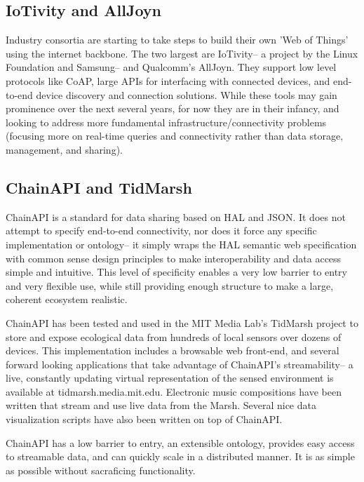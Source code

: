 \subsection{IoTivity and AllJoyn}

Industry consortia are starting to take steps to build their own 'Web of Things' using the internet backbone.  The two largest are IoTivity-- a project by the Linux Foundation and Samsung-- and Qualcomm's AllJoyn.  They support low level protocols like CoAP, large APIs for interfacing with connected devices, and end-to-end device discovery and connection solutions.  While these tools may gain prominence over the next several years, for now they are in their infancy, and looking to address more fundamental infrastructure/connectivity problems (focusing more on real-time queries and connectivity rather than data storage, management, and sharing).
		
\subsection{ChainAPI and TidMarsh}

ChainAPI is a standard for data sharing based on HAL and JSON.  It does not attempt to specify end-to-end connectivity, nor does it force any specific implementation or ontology-- it simply wraps the HAL semantic web specification with common sense design principles to make interoperability and data access simple and intuitive.  This level of specificity enables a very low barrier to entry and very flexible use, while still providing enough structure to make a large, coherent ecosystem realistic.

ChainAPI has been tested and used in the MIT Media Lab's TidMarsh project to store and expose ecological data from hundreds of local sensors over dozens of devices.  This implementation includes a browsable web front-end, and several forward looking applications that take advantage of ChainAPI's streamability-- a live, constantly updating virtual representation of the sensed environment is available at tidmarsh.media.mit.edu.  Electronic music compositions have been written that stream and use live data from the Marsh.  Several nice data visualization scripts have also been written on top of ChainAPI.

ChainAPI has a low barrier to entry, an extensible ontology, provides easy access to streamable data, and can quickly scale in a distributed manner.  It is as simple as possible without sacraficing functionality.